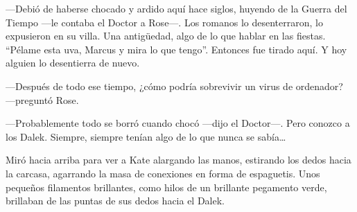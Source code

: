 ---Debió de haberse chocado y ardido aquí hace siglos, huyendo de la
Guerra del Tiempo ---le contaba el Doctor a Rose---. Los romanos lo
desenterraron, lo expusieron en su villa. Una antigüedad, algo de lo que
hablar en las fiestas. ``Pélame esta uva, Marcus y mira lo que tengo''.
Entonces fue tirado aquí. Y hoy alguien lo desentierra de nuevo.

---Después de todo ese tiempo, ¿cómo podría sobrevivir un virus de
ordenador? ---preguntó Rose.

---Probablemente todo se borró cuando chocó ---dijo el Doctor---. Pero
conozco a los Dalek. Siempre, siempre tenían algo de lo que nunca se
sabía\ldots{}

Miró hacia arriba para ver a Kate alargando las manos, estirando los
dedos hacia la carcasa, agarrando la masa de conexiones en forma de
espaguetis. Unos pequeños filamentos brillantes, como hilos de un
brillante pegamento verde, brillaban de las puntas de sus dedos hacia el
Dalek.